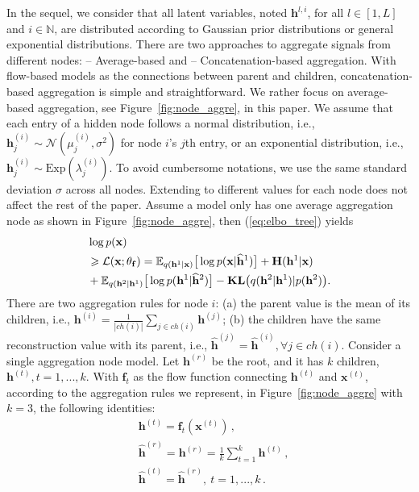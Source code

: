 \documentclass[twoside]{article}
\begin{document}
In the sequel, we consider that all latent variables, noted $\mathbf{h}^{l, i}$, for all $l \in [1, L]$ and $i \in \mathbb{N}$, are distributed according to Gaussian prior distributions or general exponential distributions.
There are two approaches to aggregate signals from different nodes:  \textsc{--} Average-based and \textsc{--} Concatenation-based  aggregation.
With flow-based models as the connections between parent and children, concatenation-based aggregation is simple and straightforward. We rather focus on average-based aggregation, see Figure~\ref{fig:node_aggre}, in this paper. 
We assume that each entry of a hidden node follows a normal distribution, i.e., $\mathbf{h}_j^{(i)} \sim \mathcal{N}(\mu_j^{(i)}, \sigma^2)$ for node $i$'s $j$th entry, or an exponential distribution, i.e., $\mathbf{h}_j^{(i)} \sim \textrm{Exp}(\lambda_j^{(i)})$. 
To avoid cumbersome notations, we use the same standard deviation $\sigma$ across all nodes. 
Extending to different values for each node does not affect the rest of the paper.
Assume a model only has one average aggregation node as shown in Figure~\ref{fig:node_aggre}, then (\ref{eq:elbo_tree}) yields
\begin{align} \notag
&\log p(\mathbf{x})  \\ \label{eq:one_agg_node}
& \geqslant \mathcal{L}(\mathbf{x}; \theta_{\mathbf{f}})=\mathbb{E}_{q(\mathbf{h}^1 | \mathbf{x})} \big[\log p(\mathbf{x}|\widehat{\mathbf{h}}^1)\big] + \mathbf{H}(\mathbf{h}^1 | \mathbf{x})  \\ \notag
&+\mathbb{E}_{q(\mathbf{h}^2 | \mathbf{h}^1)} \big[\log p(\mathbf{h}^1|\widehat{\mathbf{h}}^2)\big] - \textbf{\text{KL}}\big(q(\mathbf{h}^2 | \mathbf{h}^1) | p(\mathbf{h}^2)\big).
\end{align} 
There are two aggregation rules for node $i$: (a) the parent value is the mean of its children, i.e., $\mathbf{h}^{(i)} = \frac{1}{|ch(i)|} \sum_{j \in ch(i)} \mathbf{h}^{(j)}$; (b) the  children have the same reconstruction value with its parent, i.e., $\widehat{\mathbf{h}}^{(j)} = \widehat{\mathbf{h}}^{(i)}, \forall j \in ch(i)$. 
Consider a single aggregation node model.
Let $\mathbf{h}^{(r)}$ be the root, and it has $k$ children, $\mathbf{h}^{(t)}, t = 1,...,k$. 
With $\mathbf{f}_t$ as the flow function connecting $\mathbf{h}^{(t)}$ and $\mathbf{x}^{(t)}$, according to the aggregation rules we represent, in Figure~\ref{fig:node_aggre} with $k=3$, the following identities:
\begin{equation}
\begin{split}
& \mathbf{h}^{(t)} = \mathbf{f}_t(\mathbf{x}^{(t)})\, ,\\
& \widehat{\mathbf{h}}^{(r)} = \mathbf{h}^{(r)} = \frac{1}{k}\sum_{t=1}^k \mathbf{h}^{(t)} \, ,\\
&  \widehat{\mathbf{h}}^{(t)}= \widehat{\mathbf{h}}^{(r)}, \ t = 1,...,k \, .
 \end{split}
 \end{equation}
\end{document}
